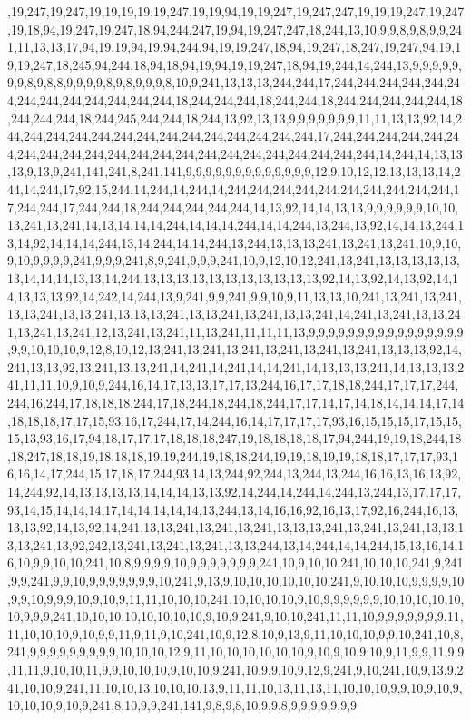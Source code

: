 ,19,247,19,247,19,19,19,19,19,247,19,19,94,19,19,247,19,247,247,19,19,19,247,19,247,19,18,94,19,247,19,247,18,94,244,247,19,94,19,247,247,18,244,13,10,9,9,8,9,8,9,9,241,11,13,13,17,94,19,19,94,19,94,244,94,19,19,247,18,94,19,247,18,247,19,247,94,19,19,19,247,18,245,94,244,18,94,18,94,19,94,19,19,247,18,94,19,244,14,244,13,9,9,9,9,9,9,9,8,9,8,8,9,9,9,9,8,9,8,9,9,9,8,10,9,241,13,13,13,244,244,17,244,244,244,244,244,244,244,244,244,244,244,244,244,18,244,244,244,18,244,244,18,244,244,244,244,244,18,244,244,244,18,244,245,244,244,18,244,13,92,13,13,9,9,9,9,9,9,9,11,11,13,13,92,14,244,244,244,244,244,244,244,244,244,244,244,244,244,244,17,244,244,244,244,244,244,244,244,244,244,244,244,244,244,244,244,244,244,244,244,244,244,14,244,14,13,13,13,9,13,9,241,141,241,8,241,141,9,9,9,9,9,9,9,9,9,9,9,9,9,12,9,10,12,12,13,13,13,14,244,14,244,17,92,15,244,14,244,14,244,14,244,244,244,244,244,244,244,244,244,244,17,244,244,17,244,244,18,244,244,244,244,244,14,13,92,14,14,13,13,9,9,9,9,9,9,10,10,13,241,13,241,14,13,14,14,14,244,14,14,14,244,14,14,244,13,244,13,92,14,14,13,244,13,14,92,14,14,14,244,13,14,244,14,14,244,13,244,13,13,13,241,13,241,13,241,10,9,10,9,10,9,9,9,9,241,9,9,9,241,8,9,241,9,9,9,241,10,9,12,10,12,241,13,241,13,13,13,13,13,13,14,14,14,13,13,14,244,13,13,13,13,13,13,13,13,13,13,13,92,14,13,92,14,13,92,14,14,13,13,13,92,14,242,14,244,13,9,241,9,9,241,9,9,10,9,11,13,13,10,241,13,241,13,241,13,13,241,13,13,241,13,13,13,241,13,13,241,13,241,13,13,241,14,241,13,241,13,13,241,13,241,13,241,12,13,241,13,241,11,13,241,11,11,11,13,9,9,9,9,9,9,9,9,9,9,9,9,9,9,9,9,9,9,10,10,10,9,12,8,10,12,13,241,13,241,13,241,13,241,13,241,13,241,13,13,13,92,14,241,13,13,92,13,241,13,13,241,14,241,14,241,14,14,241,14,13,13,13,241,14,13,13,13,241,11,11,10,9,10,9,244,16,14,17,13,13,17,17,13,244,16,17,17,18,18,244,17,17,17,244,244,16,244,17,18,18,18,244,17,18,244,18,244,18,244,17,17,14,17,14,18,14,14,14,17,14,18,18,18,17,17,15,93,16,17,244,17,14,244,16,14,17,17,17,17,93,16,15,15,15,17,15,15,15,13,93,16,17,94,18,17,17,17,18,18,18,247,19,18,18,18,18,17,94,244,19,19,18,244,18,18,247,18,18,19,18,18,18,19,19,244,19,18,18,244,19,19,18,19,19,18,18,17,17,17,93,16,16,14,17,244,15,17,18,17,244,93,14,13,244,92,244,13,244,13,244,16,16,13,16,13,92,14,244,92,14,13,13,13,13,14,14,14,13,13,92,14,244,14,244,14,244,13,244,13,17,17,17,93,14,15,14,14,14,17,14,14,14,14,14,13,244,13,14,16,16,92,16,13,17,92,16,244,16,13,13,13,92,14,13,92,14,241,13,13,241,13,241,13,241,13,13,13,241,13,241,13,241,13,13,13,13,241,13,92,242,13,241,13,241,13,241,13,13,244,13,14,244,14,14,244,15,13,16,14,16,10,9,9,10,10,241,10,8,9,9,9,9,10,9,9,9,9,9,9,9,241,10,9,10,10,241,10,10,10,241,9,241,9,9,241,9,9,10,9,9,9,9,9,9,9,10,241,9,13,9,10,10,10,10,10,10,241,9,10,10,10,9,9,9,9,10,9,9,10,9,9,9,10,9,10,9,11,11,10,10,10,241,10,10,10,10,9,10,9,9,9,9,9,9,10,10,10,10,10,10,9,9,9,241,10,10,10,10,10,10,10,10,9,10,9,241,9,10,10,241,11,11,10,9,9,9,9,9,9,9,11,11,10,10,10,9,10,9,9,11,9,11,9,10,241,10,9,12,8,10,9,13,9,11,10,10,10,9,9,10,241,10,8,241,9,9,9,9,9,9,9,9,9,10,10,10,12,9,11,10,10,10,10,10,10,9,10,9,10,9,10,9,11,9,9,11,9,9,11,11,9,10,10,11,9,9,10,10,10,9,10,10,9,241,10,9,9,10,9,12,9,241,9,10,241,10,9,13,9,241,10,10,9,241,11,10,10,13,10,10,10,13,9,11,11,10,13,11,13,11,10,10,10,9,9,10,9,10,9,10,10,10,9,10,9,241,8,10,9,9,241,141,9,8,9,8,10,9,9,8,9,9,9,9,9,9,9